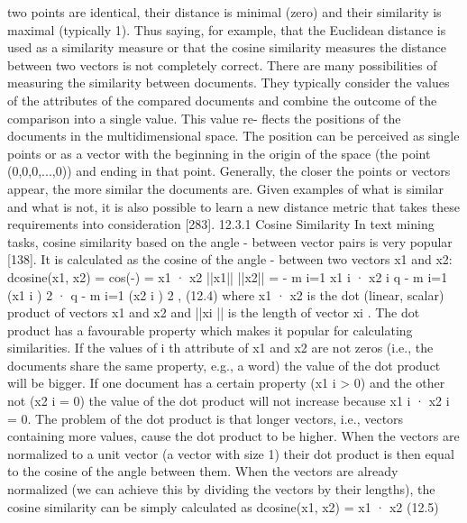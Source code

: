 \documentclass[11pt,openany,executivepaper]{book}
\begin{document}
two points are identical, their distance is minimal (zero) and their similarity is
maximal (typically 1). Thus saying, for example, that the Euclidean distance is
used as a similarity measure or that the cosine similarity measures the distance
between two vectors is not completely correct.
There are many possibilities of measuring the similarity between documents.
They typically consider the values of the attributes of the compared documents
and combine the outcome of the comparison into a single value. This value re-
flects the positions of the documents in the multidimensional space. The position
can be perceived as single points or as a vector with the beginning in the origin of
the space (the point (0,0,0,...,0)) and ending in that point. Generally, the closer
the points or vectors appear, the more similar the documents are. Given examples of what is similar and what is not, it is also possible to learn a new distance
metric that takes these requirements into consideration [283].
12.3.1 Cosine Similarity
In text mining tasks, cosine similarity based on the angle - between vector pairs
is very popular [138]. It is calculated as the cosine of the angle - between two
vectors x1 and x2:
dcosine(x1, x2) = cos(-) = x1 · x2
||x1|| ||x2|| =
-
m
i=1
x1
i
· x2
i
q
-
m
i=1
(x1
i
)
2
·
q -
m
i=1
(x2
i
)
2
, (12.4)
where x1 · x2 is the dot (linear, scalar) product of vectors x1 and x2 and ||xi
|| is
the length of vector xi
. The dot product has a favourable property which makes it
popular for calculating similarities. If the values of i
th attribute of x1 and x2 are
not zeros (i.e., the documents share the same property, e.g., a word) the value of
the dot product will be bigger. If one document has a certain property (x1
i > 0)
and the other not (x2
i = 0) the value of the dot product will not increase because
x1
i
· x2
i = 0.
The problem of the dot product is that longer vectors, i.e., vectors containing
more values, cause the dot product to be higher. When the vectors are normalized
to a unit vector (a vector with size 1) their dot product is then equal to the cosine
of the angle between them. When the vectors are already normalized (we can
achieve this by dividing the vectors by their lengths), the cosine similarity can be
simply calculated as
dcosine(x1, x2) = x1 · x2 (12.5)
\end{document}
